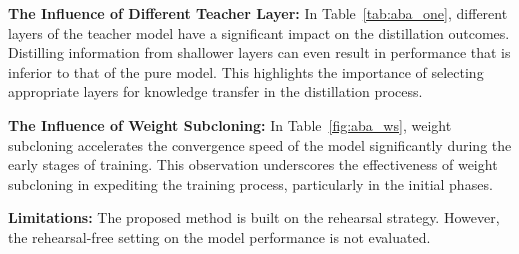 \noindent\textbf{The Influence of Different Teacher Layer:}
In Table~\ref{tab:aba_one}, different layers of the teacher model have a significant impact on the distillation outcomes. Distilling information from shallower layers can even result in performance that is inferior to that of the pure model. This highlights the importance of selecting appropriate layers for knowledge transfer in the distillation process.




\noindent\textbf{The Influence of Weight Subcloning:}
In Table~\ref{fig:aba_ws}, weight subcloning accelerates the convergence speed of the model significantly during the early stages of training. This observation underscores the effectiveness of weight subcloning in expediting the training process, particularly in the initial phases.













\noindent \textbf{Limitations:}
The proposed method is built on the rehearsal strategy. However, the rehearsal-free setting on the model performance is not evaluated.


